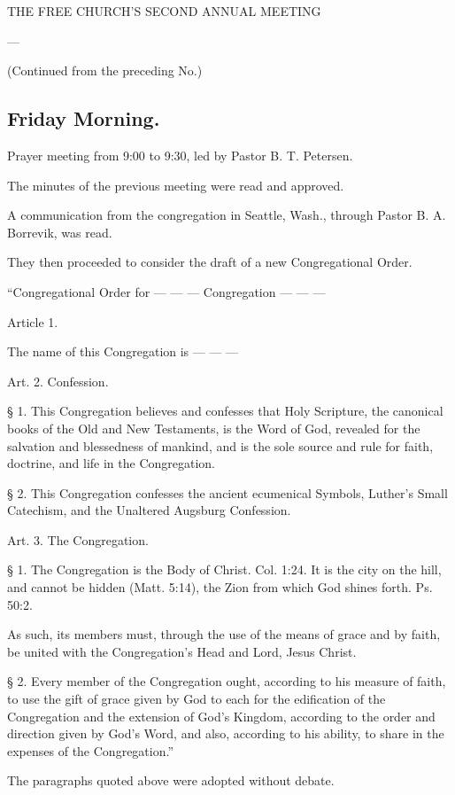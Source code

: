 
THE FREE CHURCH’S SECOND ANNUAL MEETING

—

(Continued from the preceding No.)

\subsection{Friday Morning.}

Prayer meeting from 9:00 to 9:30, led by Pastor B. T. Petersen.

The minutes of the previous meeting were read and approved.

A communication from the congregation in Seattle, Wash., through Pastor B. A. Borrevik, was read.

They then proceeded to consider the draft of a new Congregational Order.

“Congregational Order
for
— — — Congregation — — —

Article 1.

The name of this Congregation is — — —

Art. 2.
Confession.

§ 1. This Congregation believes and confesses that Holy Scripture, the canonical books of the Old and New Testaments, is the Word of God, revealed for the salvation and blessedness of mankind, and is the sole source and rule for faith, doctrine, and life in the Congregation.

§ 2. This Congregation confesses the ancient ecumenical Symbols, Luther’s Small Catechism, and the Unaltered Augsburg Confession.

Art. 3.
The Congregation.

§ 1. The Congregation is the Body of Christ. Col. 1:24. It is the city on the hill, and cannot be hidden (Matt. 5:14), the Zion from which God shines forth. Ps. 50:2.

As such, its members must, through the use of the means of grace and by faith, be united with the Congregation’s Head and Lord, Jesus Christ.

§ 2. Every member of the Congregation ought, according to his measure of faith, to use the gift of grace given by God to each for the edification of the Congregation and the extension of God’s Kingdom, according to the order and direction given by God’s Word, and also, according to his ability, to share in the expenses of the Congregation.”

The paragraphs quoted above were adopted without debate.


